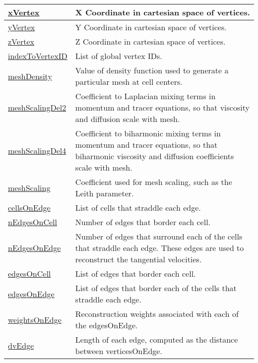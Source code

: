 {\begin{center}
\begin{longtable}{| p{2.0in} | p{4.0in} |}
	\hline
	\hyperref[subsec:var_sec_mesh_xVertex]{xVertex} & X Coordinate in cartesian space of vertices. \\
	\hline
	\hyperref[subsec:var_sec_mesh_yVertex]{yVertex} & Y Coordinate in cartesian space of vertices. \\
	\hline
	\hyperref[subsec:var_sec_mesh_zVertex]{zVertex} & Z Coordinate in cartesian space of vertices. \\
	\hline
	\hyperref[subsec:var_sec_mesh_indexToVertexID]{indexToVertexID} & List of global vertex IDs. \\
	\hline
	\hyperref[subsec:var_sec_mesh_meshDensity]{meshDensity} & Value of density function used to generate a particular mesh at cell centers. \\
	\hline
	\hyperref[subsec:var_sec_mesh_meshScalingDel2]{meshScalingDel2} & Coefficient to Laplacian mixing terms in momentum and tracer equations, so that viscosity and diffusion scale with mesh. \\
	\hline
	\hyperref[subsec:var_sec_mesh_meshScalingDel4]{meshScalingDel4} & Coefficient to biharmonic mixing terms in momentum and tracer equations, so that biharmonic viscosity and diffusion coefficients scale with mesh. \\
	\hline
	\hyperref[subsec:var_sec_mesh_meshScaling]{meshScaling} & Coefficient used for mesh scaling, such as the Leith parameter. \\
	\hline
	\hyperref[subsec:var_sec_mesh_cellsOnEdge]{cellsOnEdge} & List of cells that straddle each edge. \\
	\hline
	\hyperref[subsec:var_sec_mesh_nEdgesOnCell]{nEdgesOnCell} & Number of edges that border each cell. \\
	\hline
	\hyperref[subsec:var_sec_mesh_nEdgesOnEdge]{nEdgesOnEdge} & Number of edges that surround each of the cells that straddle each edge. These edges are used to reconstruct the tangential velocities. \\
	\hline
	\hyperref[subsec:var_sec_mesh_edgesOnCell]{edgesOnCell} & List of edges that border each cell. \\
	\hline
	\hyperref[subsec:var_sec_mesh_edgesOnEdge]{edgesOnEdge} & List of edges that border each of the cells that straddle each edge. \\
	\hline
	\hyperref[subsec:var_sec_mesh_weightsOnEdge]{weightsOnEdge} & Reconstruction weights associated with each of the edgesOnEdge. \\
	\hline
	\hyperref[subsec:var_sec_mesh_dvEdge]{dvEdge} & Length of each edge, computed as the distance between verticesOnEdge. \\

\end{longtable}
\end{center}}
